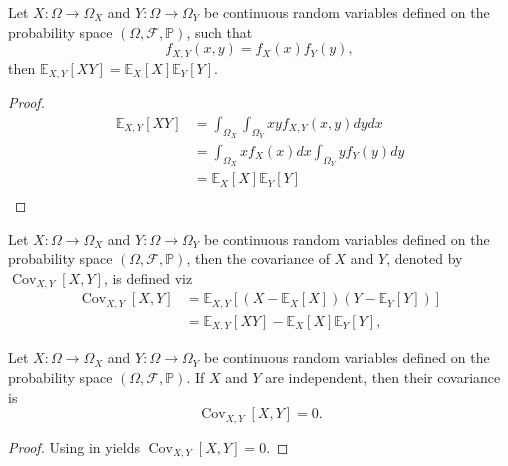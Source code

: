\begin{theorem}
	\label{theorem:expectation_independent}
	Let $X: \Omega \to \Omega_X$ and $Y: \Omega \to \Omega_Y$ be continuous random variables defined on the probability space $(\Omega, \mathcal{F}, \mathbb{P})$, such that
	\begin{equation}
	f_{X,Y}(x,y)=f_X(x)f_Y(y),	
	\end{equation}
	then $\mathbb{E}_{X,Y}[XY]=\mathbb{E}_X[X]\mathbb{E}_Y[Y]$.
\end{theorem}

\begin{proof}
	\begin{equation}
		\begin{split}
			\mathbb{E}_{X,Y}[XY] &= \int_{\Omega_X}\int_{\Omega_Y}x y f_{X,Y}(x,y) dy dx\\
			&= \int_{\Omega_X} x f_X(x) dx\int_{\Omega_Y} yf_Y(y) dy\\
			&= \mathbb{E}_X[X]\mathbb{E}_Y[Y]\\
		\end{split}
	\end{equation}
\end{proof}

\begin{definition}[Covariance]
	\label{def:covariance}
	Let $X: \Omega \to \Omega_X$ and $Y: \Omega \to \Omega_Y$ be continuous random variables defined on the probability space $(\Omega, \mathcal{F}, \mathbb{P})$, then the covariance of $X$ and $Y$, denoted by $\operatorname{Cov}_{X,Y}[X,Y]$, is defined viz
	\begin{equation}
		\begin{split}
			\operatorname{Cov}_{X,Y}[X,Y]&=\mathbb{E}_{X,Y}[(X-\mathbb{E}_X[X])(Y-\mathbb{E}_Y[Y])]\\
			&=\mathbb{E}_{X,Y}[XY]-\mathbb{E}_X[X]\mathbb{E}_Y[Y],
		\end{split}
	\end{equation}
\end{definition}
\begin{theorem}
	\label{theorem:covariance_of_independent_variables}
	Let $X: \Omega \to \Omega_X$ and $Y: \Omega \to \Omega_Y$ be continuous random variables defined on the probability space $(\Omega, \mathcal{F}, \mathbb{P})$. If $X$ and $Y$ are independent, then their covariance is
	\begin{equation}
		\operatorname{Cov}_{X,Y}[X,Y] = 0.
	\end{equation}
	
\end{theorem}
\begin{proof}
	Using  in  yields $\operatorname{Cov}_{X,Y}[X,Y]=0$.
\end{proof}

